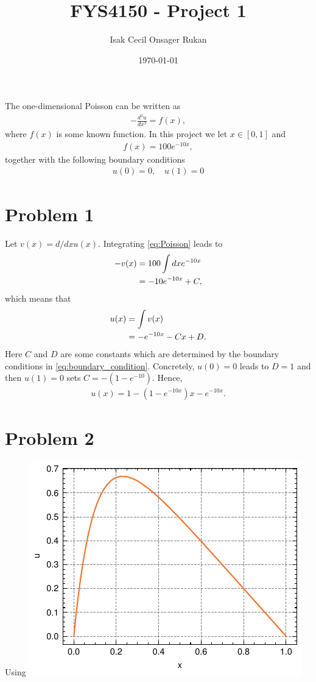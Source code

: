 \documentclass[english,notitlepage,reprint,nofootinbib]{revtex4-2}  %
\begin{document}
\title{FYS4150 - Project 1}  %
\author{Isak Cecil Onsager Rukan} %
\date{\today}                             %
\noaffiliation                            %
\maketitle
The one-dimensional Poisson can be written as 
\begin{align}
    -\frac{d^2u}{dx^2} = f(x),  \label{eq:Poisson}
\end{align}
where $f(x)$ is some known function. In this project we let \(x\in[0,1]\) and
\begin{align}
    f(x) = 100e^{-10x}, \label{eq:f_x}
\end{align}
together with the following boundary conditions
\begin{align}
    u(0)=0, \quad u(1)=0 \label{eq:boundary_condition}
\end{align}
\section{Problem 1}
Let $v(x)=d/dx u(x)$. Integrating \eqref{eq:Poisson} leads to 
\begin{align}
    -v(x) &= 100\int dxe^{-10x}
    \notag \\
    &= -10e^{-10x} + C,
\end{align}
which means that 
\begin{align}
    u(x) &= \int v(x) 
    \notag \\
    &= -e^{-10x} - Cx + D.
\end{align}
Here $C$ and $D$ are some constants which are determined by the boundary conditions in \eqref{eq:boundary_condition}. Concretely, \(u(0)=0\) leads to $D=1$ and then \(u(1)=0\) sets \(C=-(1-e^{-10})\). Hence,
\begin{align}
    u(x) = 1 - (1 - e^{-10x})x - e^{-10x}.
\end{align}
\section{Problem 2}
Using 
\includegraphics{Figs/problem2.pdf}

\onecolumngrid
% 


\end{document}
